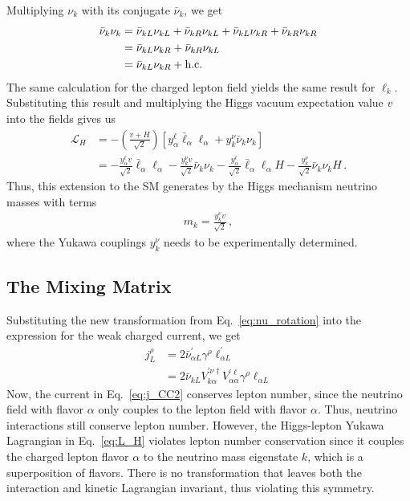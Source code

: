 Multiplying $\nu_k$ with its conjugate $\bar{\nu}_k$, we get 
\begin{align}
    \bar{\nu}_k \nu_k 
    & = \bar{\nu}_{k L} \nu_{k L} +\bar{\nu}_{k R}\nu_{k L} + \bar{\nu}_{k L}\nu_{k R} + \bar{\nu}_{k R}\nu_{k R} \nonumber \\
    & = \bar{\nu}_{k L}\nu_{k R} + \bar{\nu}_{k R}\nu_{k L} \nonumber \\
    & = \bar{\nu}_{k L}\nu_{k R} + \text{{h.c.}}
\end{align}
The same calculation for the charged lepton field yields the same result for $\ell_k$. Substituting this result and multiplying the Higgs vacuum expectation value $v$ into the fields gives us
\begin{align}
    \mathcal{L}_{H} 
    &=-\left( \frac{v + H}{\sqrt{2}} \right) \left[ y_{\alpha}^{\ell}   \bar{\ell}_\alpha \ell_\alpha  +  y_{k}^{\nu} \bar{\nu}_k \nu_k \right] \nonumber \\
    &=- \frac{y_{\alpha}^{\ell} v}{\sqrt{2}}   \bar{\ell}_\alpha \ell_\alpha   -  \frac{ y_{k}^{\nu} v}{\sqrt{2}} \bar{\nu}_k \nu_k  - \frac{y_{\alpha}^{\ell}}{\sqrt{2}}   \bar{\ell}_\alpha \ell_\alpha H  -  \frac{ y_{k}^{\nu}}{\sqrt{2}} \bar{\nu}_k \nu_k H\,.
\end{align}
Thus, this extension to the SM generates by the Higgs mechanism neutrino masses with terms
\begin{align}
    m_k = \frac{y_k^\nu v}{\sqrt{2}}\,,
\end{align}
where the Yukawa couplings $y^\nu_k$ needs to be experimentally determined.
\subsection{The Mixing Matrix}
Substituting the new transformation from Eq.~\ref{eq:nu_rotation} into the expression for the weak charged current, we get
\begin{align}\label{eq:j_CC2}
    j^\rho_L &= 2\bar{\nu}^\prime_{\alpha L} \gamma^\rho \ell_{\alpha L}^\prime \nonumber \\
             &= 2\bar{\nu}_{k L} V^{\prime \nu \dagger}_{k \alpha}V^{\prime \ell}_{\alpha \alpha} \gamma^\rho  \ell_{\alpha L}
\end{align}
Now, the current in Eq.~\ref{eq:j_CC2} conserves lepton number, since the neutrino field with flavor $\alpha$ only couples to the lepton field with flavor $\alpha$. 
Thus, neutrino interactions still conserve lepton number.
However, the Higgs-lepton Yukawa Lagrangian 
in Eq.~\ref{eq:L_H} violates lepton number conservation since it couples the charged lepton flavor $\alpha$ to the neutrino mass eigenstate $k$, which is a superposition of flavors. 
There is no transformation that leaves both the interaction and kinetic Lagrangian invariant, thus violating this symmetry.


